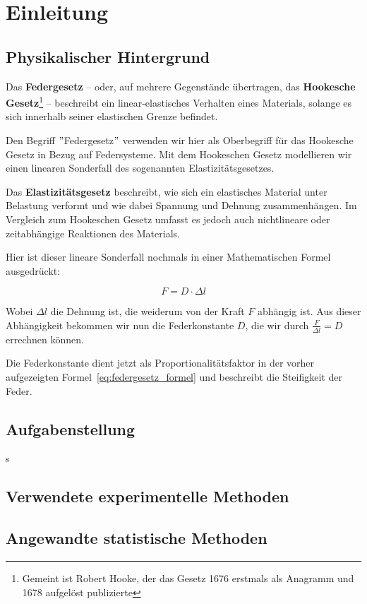 \documentclass[../main.tex]{subfiles} %
\begin{document}
\chapter{Einleitung}\label{ch:einleitung}


    \section{Physikalischer Hintergrund}\label{sec:physikalischer-hintergrund}

        Das \textbf{Federgesetz} – oder, auf mehrere Gegenstände übertragen, das \textbf{Hookesche Gesetz}\footnote{Gemeint ist Robert Hooke, der das Gesetz 1676 erstmals als Anagramm und 1678 aufgelöst publizierte} – beschreibt ein linear-elastisches Verhalten eines Materials, solange es sich innerhalb seiner elastischen Grenze befindet.

        Den Begriff \("\)Federgesetz\("\) verwenden wir hier als Oberbegriff für das Hookesche Gesetz in Bezug auf Federsysteme.
        Mit dem Hookeschen Gesetz modellieren wir einen linearen Sonderfall des sogenannten Elastizitätsgesetzes.

        \begin{tcolorbox}[title=Ausholung für das Elastizitätsgesetz]
            Das \textbf{Elastizitätsgesetz} beschreibt, wie sich ein elastisches Material unter Belastung verformt und wie dabei Spannung und Dehnung zusammenhängen.
            Im Vergleich zum Hookeschen Gesetz umfasst es jedoch auch nichtlineare oder zeitabhängige Reaktionen des Materials.
        \end{tcolorbox}

        Hier ist dieser lineare Sonderfall nochmals in einer Mathematischen Formel ausgedrückt:

        \begin{equation}
            F = D \cdot \Delta l
        \label{eq:federgesetz_formel}
        \end{equation}

        Wobei ${\Delta l}$ die Dehnung ist, die weiderum von der Kraft ${F}$ abhängig ist.
        Aus dieser Abhängigkeit bekommen wir nun die Federkonstante ${D}$, die wir durch ${\frac{F}{\Delta l} = D}$ errechnen können.

        Die Federkonstante dient jetzt als Proportionalitätsfaktor in der vorher aufgezeigten Formel~\ref{eq:federgesetz_formel} und beschreibt die Steifigkeit der Feder.


    \section{Aufgabenstellung}\label{sec:aufgabenstellung}s




    \section{Verwendete experimentelle Methoden}\label{sec:verwendete-experimentelle-methoden}


    \section{Angewandte statistische Methoden}\label{sec:angewandte-statistische-methoden}
\end{document}
